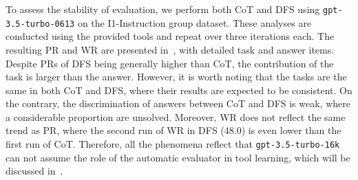 \begin{table}[t!]
    \small
    \centering
    \caption{Experiments use \texttt{GPT-3.5-Turbo-0613} with CoT and DFS. S, US, and UE indicate solvable (solved), unsolvable (unsolved), and unsure. Pass and Win denote pass rate and win rate, respectively. Win rates are evaluated against the first run of CoT. This experiment is run on 4 Feb 2024.}
    \label{tab:sta_eval}
\end{table}

To assess the stability of evaluation, we perform both CoT and DFS using \texttt{gpt-3.5-turbo-0613} on the I1-Instruction group dataset. 
These analyses are conducted using the provided tools and repeat over three iterations each.
The resulting PR and WR are presented in~, with detailed task and answer items.
Despite PRs of DFS being generally higher than CoT, the contribution of the task is larger than the answer.
However, it is worth noting that the tasks are the same in both CoT and DFS, where their results are expected to be consistent.
On the contrary, the discrimination of answers between CoT and DFS is weak, where a considerable proportion are unsolved.
Moreover, WR does not reflect the same trend as PR, where the second run of WR in DFS (48.0) is even lower than the first run of CoT.
Therefore, all the phenomena reflect that \texttt{gpt-3.5-turbo-16k} can not assume the role of the automatic evaluator in tool learning, which will be discussed in~.


